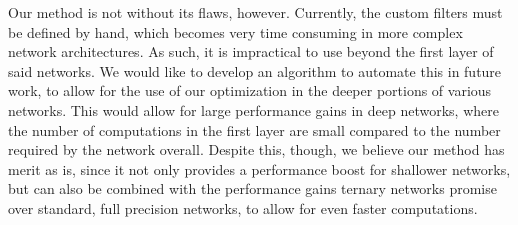 \documentclass[11pt,a4paper,oldfontcommands]{memoir}
\begin{document}
Our method is not without its flaws, however. Currently, the custom filters must be defined by hand, which becomes very time consuming in more complex network architectures. As such, it is impractical to use beyond the first layer of said networks. We would like to develop an algorithm to automate this in future work, to allow for the use of our optimization in the deeper portions of various networks. This would allow for large performance gains in deep networks, where the number of computations in the first layer are small compared to the number required by the network overall. Despite this, though, we believe our method has merit as is, since it not only provides a performance boost for shallower networks, but can also be combined with the performance gains ternary networks promise over standard, full precision networks, to allow for even faster computations. 







\end{document}
